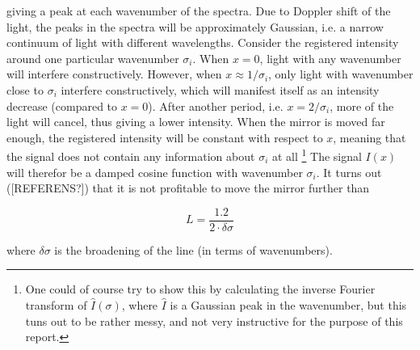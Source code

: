 \documentclass[a4paper]{article}
\begin{document}
giving a peak at each wavenumber of the spectra. Due to Doppler shift of the light, the peaks in the spectra will be approximately Gaussian, i.e. a narrow continuum of light with different wavelengths. Consider the registered intensity around one particular wavenumber $\sigma_i$. When $x=0$, light with any wavenumber will interfere constructively. However, when $x\approx 1/ \sigma_i$, only light with wavenumber close to $\sigma_i$ interfere constructively, which will manifest itself as an intensity decrease (compared to $x=0$). After another period, i.e. $x=2/\sigma_i$, more of the light will cancel, thus giving a lower intensity. When the mirror is moved far enough, the registered intensity will be constant with respect to $x$, meaning that the signal does not contain any information about $\sigma_i$ at all \footnote{One could of course try to show this by calculating the inverse Fourier transform of $\hat{I}(\sigma)$, where $\hat{I}$ is a Gaussian peak in the wavenumber, but this tuns out to be rather messy, and not very instructive for the purpose of this report.} The signal $I(x)$ will therefor be a damped cosine function with wavenumber $\sigma_i$. It turns out ([REFERENS?]) that it is not profitable to move the mirror further than

\begin{equation}

L = \frac{1.2}{2\cdot \delta \sigma} %

\end{equation}

where $\delta \sigma$ is the broadening of the line (in terms of wavenumbers).
\end{document}
